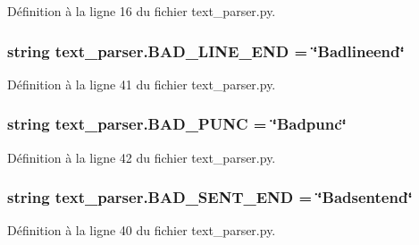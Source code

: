 Définition à la ligne 16 du fichier text\+\_\+parser.\+py.

\hypertarget{namespacetext__parser_ac9e29d1d799ef4dfbd672617eaae08d3}{}
\subsubsection[{B\+A\+D\+\_\+\+L\+I\+N\+E\+\_\+\+E\+N\+D}]{\setlength{\rightskip}{0pt plus 5cm}string text\+\_\+parser.\+B\+A\+D\+\_\+\+L\+I\+N\+E\+\_\+\+E\+N\+D = \char`\"{}Badlineend\char`\"{}}\label{namespacetext__parser_ac9e29d1d799ef4dfbd672617eaae08d3}


Définition à la ligne 41 du fichier text\+\_\+parser.\+py.

\hypertarget{namespacetext__parser_a51b23515f4a2706e48b19a9f3e03d143}{}
\subsubsection[{B\+A\+D\+\_\+\+P\+U\+N\+C}]{\setlength{\rightskip}{0pt plus 5cm}string text\+\_\+parser.\+B\+A\+D\+\_\+\+P\+U\+N\+C = \char`\"{}Badpunc\char`\"{}}\label{namespacetext__parser_a51b23515f4a2706e48b19a9f3e03d143}


Définition à la ligne 42 du fichier text\+\_\+parser.\+py.

\hypertarget{namespacetext__parser_aae799e995dc6b572bed44911f95cc87a}{}
\subsubsection[{B\+A\+D\+\_\+\+S\+E\+N\+T\+\_\+\+E\+N\+D}]{\setlength{\rightskip}{0pt plus 5cm}string text\+\_\+parser.\+B\+A\+D\+\_\+\+S\+E\+N\+T\+\_\+\+E\+N\+D = \char`\"{}Badsentend\char`\"{}}\label{namespacetext__parser_aae799e995dc6b572bed44911f95cc87a}


Définition à la ligne 40 du fichier text\+\_\+parser.\+py.

